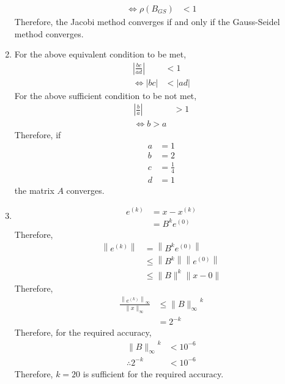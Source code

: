 \documentclass[fleqn, a4paper, 12pt, twoside]{article}
\theoremstyle{definition}
\theoremstyle{theorem}
\begin{document}
\begin{solution}
\begin{enumerate}[leftmargin=*]
\begin{align*}
				\iff \rho(B_{GS})                          & < 1
			\end{align*}
			Therefore, the Jacobi method converges if and only if the Gauss-Seidel method converges.
		\item
			For the above equivalent condition to be met,
			\begin{align*}
				\left| \frac{b c}{a d} \right| & < 1 \\
				\iff |b c|                     & < |a d|
			\end{align*}
			For the above sufficient condition to be not met,
			\begin{align*}
				\left| \frac{b}{a} \right| & > 1 \\
				\iff b > a
			\end{align*}
			Therefore, if
			\begin{align*}
				a & = 1           \\
				b & = 2           \\
				c & = \frac{1}{4} \\
				d & = 1
			\end{align*}
			the matrix $A$ converges.
		\item
			\begin{align*}
				e^{(k)} & = x - x^{(k)} \\
                                        & = B^k e^{(0)}
			\end{align*}
			Therefore,
			\begin{align*}
				\left\| e^{(k)} \right\| & = \left\| B^k e^{(0)} \right\|                    \\
                                                         & \le \left\| B^k \right\| \left\| e^{(0)} \right\| \\
                                                         & \le \|B\|^k \|x - 0\|
			\end{align*}
			Therefore,
			\begin{align*}
				\frac{\left\| e^{(k)} \right\|_{\infty}}{\|x\|_{\infty}} & \le {\|B\|_{\infty}}^k \\
                                                                                         & = 2^{-k}
			\end{align*}
			Therefore, for the required accuracy,
			\begin{align*}
				{\|B\|_{\infty}}^k & < 10^{-6} \\
				\therefore 2^{-k}  & < 10^{-6}
			\end{align*}
			Therefore, $k = 20$ is sufficient for the required accuracy.
	\end{enumerate}
\end{solution}
\end{document}
